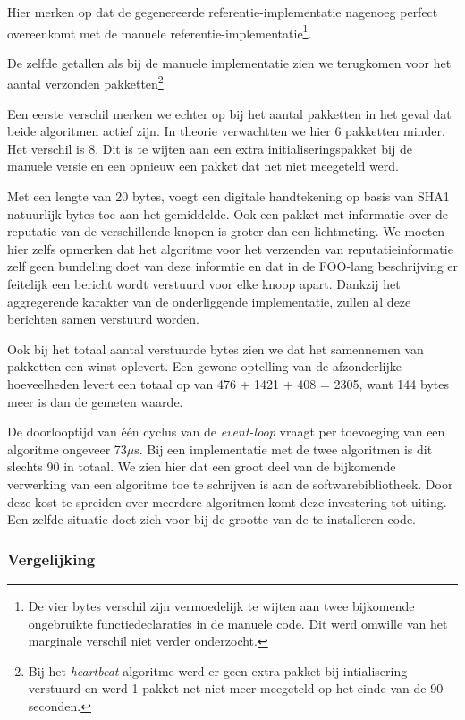 Hier merken op dat de gegenereerde referentie-implementatie nagenoeg perfect
overeenkomt met de manuele referentie-implementatie\footnote{De vier bytes
verschil zijn vermoedelijk te wijten aan twee bijkomende ongebruikte
functiedeclaraties in de manuele code. Dit werd omwille van het marginale
verschil niet verder onderzocht.}.

De zelfde getallen als bij de manuele implementatie zien we terugkomen voor het
aantal verzonden pakketten\footnote{Bij het \emph{heartbeat} algoritme werd er
geen extra pakket bij intialisering verstuurd en werd 1 pakket net niet meer
meegeteld op het einde van de 90 seconden.}

Een eerste verschil merken we echter op bij het aantal pakketten in het geval
dat beide algoritmen actief zijn. In theorie verwachtten we hier 6 pakketten
minder. Het verschil is 8. Dit is te wijten aan een extra initialiseringspakket
bij de manuele versie en een opnieuw een pakket dat net niet meegeteld werd.

Met een lengte van 20 bytes, voegt een digitale handtekening op basis van SHA1
natuurlijk bytes toe aan het gemiddelde. Ook een pakket met informatie over de
reputatie van de verschillende knopen is groter dan een lichtmeting. We moeten
hier zelfs opmerken dat het algoritme voor het verzenden van
reputatieinformatie zelf geen bundeling doet van deze informtie en dat in de
FOO-lang beschrijving er feitelijk een bericht wordt verstuurd voor elke knoop
apart. Dankzij het aggregerende karakter van de onderliggende implementatie,
zullen al deze berichten samen verstuurd worden.

Ook bij het totaal aantal verstuurde bytes zien we dat het samennemen van
pakketten een winst oplevert. Een gewone optelling van de afzonderlijke
hoeveelheden levert een totaal op van 476 + 1421 + 408 = 2305, want 144 bytes
meer is dan de gemeten waarde.

De doorlooptijd van \'e\'en cyclus van de \emph{event-loop} vraagt per
toevoeging van een algoritme ongeveer 73$\mu$s. Bij een implementatie met de
twee algoritmen is dit slechts 90 in totaal. We zien hier dat een groot deel
van de bijkomende verwerking van een algoritme toe te schrijven is aan de
softwarebibliotheek. Door deze kost te spreiden over meerdere algoritmen komt
deze investering tot uiting. Een zelfde situatie doet zich voor bij de grootte
van de te installeren code.

\vspace{-3mm}

\subsubsection{Vergelijking}

